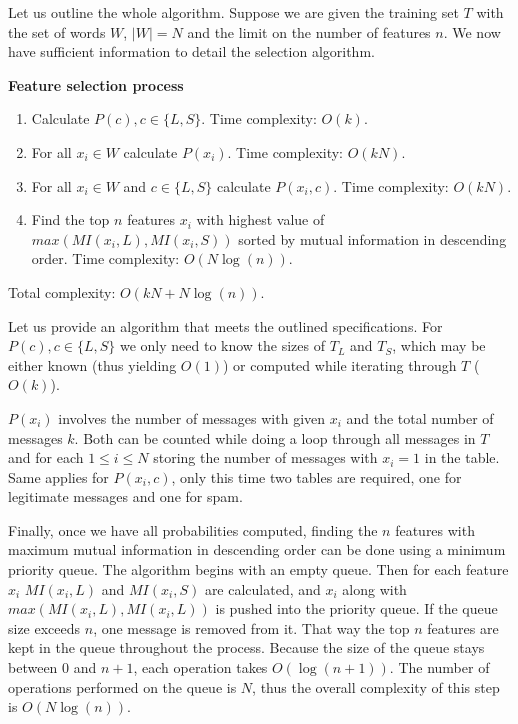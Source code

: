 \documentclass[12pt]{report}
\begin{document}
Let us outline the whole algorithm. Suppose we are given the training set $T$ with the set of words $W$, $|W| = N$ and the limit on the number of features $n$. We now have sufficient information to detail the selection algorithm.

\textbf{Feature selection process}

\begin{enumerate}
	\item Calculate $P(c), c \in \{L, S\}$. Time complexity: $O(k)$.
	\item For all $x_i \in W$ calculate $P(x_i)$. Time complexity: $O(kN)$.
	\item For all $x_i \in W$ and $c \in \{L, S\}$ calculate $P(x_i, c)$. Time complexity: $O(kN)$.
	\item Find the top $n$ features $x_i$ with highest value of $max(MI(x_i, L), MI(x_i, S))$ sorted by mutual information in descending order. Time complexity: $O(N \log(n))$.
\end{enumerate}

Total complexity: $O(kN + N \log(n))$.

Let us provide an algorithm that meets the outlined specifications. For $P(c), c \in \{L, S\}$ we only need to know the sizes of $T_L$ and $T_S$, which may be either known (thus yielding $O(1)$) or computed while iterating through $T$ ($O(k)$).

$P(x_i)$ involves the number of messages with given $x_i$ and the total number of messages $k$. Both can be counted while doing a loop through all messages in $T$ and for each $1 \le i \le N$ storing the number of messages with $x_i = 1$ in the table. Same applies for $P(x_i, c)$, only this time two tables are required, one for legitimate messages and one for spam.

Finally, once we have all probabilities computed, finding the $n$ features with maximum mutual information in descending order can be done using a minimum priority queue. The algorithm begins with an empty queue. Then for each feature $x_i$ $MI(x_i, L)$ and $MI(x_i, S)$ are calculated, and $x_i$ along with $max(MI(x_i, L), MI(x_i, L))$ is pushed into the priority queue. If the queue size exceeds $n$, one message is removed from it. That way the top $n$ features are kept in the queue throughout the process. Because the size of the queue stays between $0$ and $n + 1$, each operation takes $O(\log(n + 1))$. The number of operations performed on the queue is $N$, thus the overall complexity of this step is $O(N \log(n))$.
\end{document}
